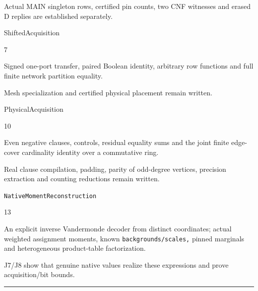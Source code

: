 \documentclass[11pt,a4paper]{article}
\newlength{\OfflineResearchTableWidth}
\newcommand{\OfflineResearchHeaderRule}{\noindent\rule{\linewidth}{0.45pt}\par}
\newcommand{\OfflineResearchRow}{\par}
\newenvironment{OfflineResearchTable}{%
  \par\medskip\begingroup\small\setlength{\parindent}{0pt}%
  \setlength{\parskip}{3pt plus 1pt minus .5pt}%
  \setlength{\OfflineResearchTableWidth}{\linewidth}%
}{%
  \par\endgroup\medskip%
}
\begin{document}
\begin{OfflineResearchTable}
\begin{minipage}[t]{0.31185\OfflineResearchTableWidth}
Actual MAIN singleton rows,
certified pin counts, two CNF witnesses and erased D replies are
established separately.
\end{minipage}%
\OfflineResearchRow
\noindent%
\begin{minipage}[t]{0.23625\OfflineResearchTableWidth}\raggedright
ShiftedAcquisition
\end{minipage}\hfill%
\begin{minipage}[t]{0.08505\OfflineResearchTableWidth}\raggedright
7
\end{minipage}\hfill%
\begin{minipage}[t]{0.31185\OfflineResearchTableWidth}\raggedright
Signed one-port transfer, paired Boolean
identity, arbitrary row functions and full finite network partition
equality.
\end{minipage}\hfill%
\begin{minipage}[t]{0.31185\OfflineResearchTableWidth}\raggedright
Mesh specialization and certified physical placement remain
written.
\end{minipage}%
\OfflineResearchRow
\noindent%
\begin{minipage}[t]{0.23625\OfflineResearchTableWidth}\raggedright
PhysicalAcquisition
\end{minipage}\hfill%
\begin{minipage}[t]{0.08505\OfflineResearchTableWidth}\raggedright
10
\end{minipage}\hfill%
\begin{minipage}[t]{0.31185\OfflineResearchTableWidth}\raggedright
Even negative clauses, controls, residual
equality sums and the joint finite edge-cover cardinality identity over
a commutative ring.
\end{minipage}\hfill%
\begin{minipage}[t]{0.31185\OfflineResearchTableWidth}\raggedright
Real clause compilation, padding, parity of
odd-degree vertices, precision extraction and counting reductions remain
written.
\end{minipage}%
\OfflineResearchRow
\noindent%
\begin{minipage}[t]{0.23625\OfflineResearchTableWidth}\raggedright
\texttt{NativeMoment\allowbreak{}Reconstruction}
\end{minipage}\hfill%
\begin{minipage}[t]{0.08505\OfflineResearchTableWidth}\raggedright
13
\end{minipage}\hfill%
\begin{minipage}[t]{0.31185\OfflineResearchTableWidth}\raggedright
An explicit
inverse Vandermonde decoder from distinct coordinates; actual weighted
assignment moments, known \nolinkurl{backgrounds/scales,} pinned
marginals and heterogeneous product-table factorization.
\end{minipage}\hfill%
\begin{minipage}[t]{0.31185\OfflineResearchTableWidth}\raggedright
J7/J8 show
that genuine native values realize these expressions and prove
acquisition/bit bounds.
\end{minipage}%
\OfflineResearchRow
\OfflineResearchHeaderRule
\end{OfflineResearchTable}
\end{document}

